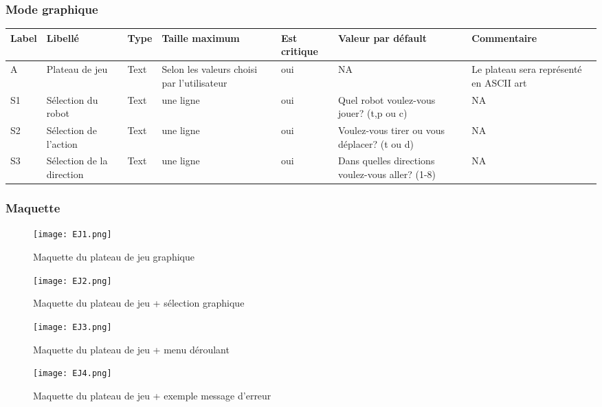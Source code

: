 \documentclass[12pt,a4paper]{article}
\begin{document}
\begin{itemize}
			\subsubsection{Mode graphique}
				\hspace{-3cm}
				\begin{tabular}{|p{1cm}|p{2.5cm}|p{1.5cm}|p{2.5cm}|p{2.5cm}|p{3cm}|p{3cm}|} %
					\hline
						Label & Libellé & Type & Taille maximum & Est critique & Valeur par défault & Commentaire \\
					\hline \hline
						A & Plateau de jeu & Text & Selon les valeurs choisi par l'utilisateur & oui & NA & Le plateau sera représenté en ASCII art \\
						\hline
						S1 & Sélection du robot & Text & une ligne & oui & Quel robot voulez-vous jouer? (t,p ou c) & NA \\
						\hline
						S2 &Sélection de l'action & Text & une ligne & oui & Voulez-vous tirer ou vous déplacer? (t ou d) &  NA \\
						\hline
						S3 & Sélection de la direction & Text & une ligne & oui & Dans quelles directions voulez-vous aller? (1-8) & NA\\
					\hline
				\end{tabular}
				\label{Informations présentes sur l'écran de jeu texte}
				\subsubsection*{Maquette}
					\begin{figure}[!h] %
						\texttt{[image: EJ1.png]}
						\caption{Maquette du plateau de jeu graphique}
						\label{Maquette du plateau de jeu graphique}
					\end{figure}
					\newpage
					\begin{figure}[!h] %
						\texttt{[image: EJ2.png]}
						\caption{Maquette du plateau de jeu + sélection graphique}
						\label{Maquette du plateau de jeu + sélection graphique}
					\end{figure}
					\begin{figure}[!h] %
						\texttt{[image: EJ3.png]}
						\caption{Maquette du plateau de jeu + menu déroulant}
						\label{Maquette du plateau de jeu + menu déroulant}
					\end{figure}
					\begin{figure}[!h] %
						\texttt{[image: EJ4.png]}
						\caption{Maquette du plateau de jeu + exemple message d'erreur}
						\label{Maquette du plateau de jeu + exemple message d'erreur}
					\end{figure}


\end{itemize}
\end{document}

